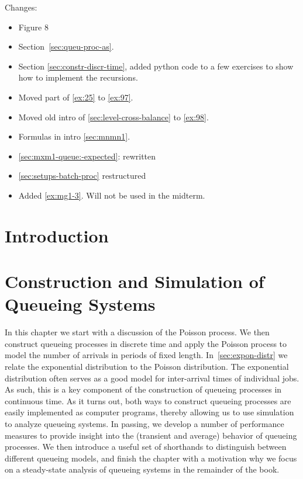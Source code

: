 \author{Nicky D. van  Foreest}


\frontmatter
\maketitle

Changes:
\begin{itemize}
\item Figure 8
\item Section~\ref{sec:queu-proc-as}.
\item Section \ref{sec:constr-discr-time}, added python code to a few exercises to show how to implement the recursions.
\item Moved part of \cref{ex:25} to \cref{ex:97}.
\item Moved old intro of \cref{sec:level-cross-balance} to \cref{ex:98}.
\item Formulas in intro \cref{sec:mnmn1}.
\item \cref{sec:mxm1-queue:-expected}: rewritten
\item \cref{sec:setups-batch-proc} restructured
\item Added \cref{ex:mg1-3}. Will not be used in the midterm.
\end{itemize}


\tableofcontents

\chapter{Introduction}
\label{cha:introduction}



\mainmatter

\chapter{Construction and Simulation of Queueing Systems}
\label{cha:single-stat-queu}

In this chapter we start with a discussion of the Poisson process.
We then construct queueing processes in discrete time and apply the Poisson process to model the number of arrivals in periods of fixed length.
In~\cref{sec:expon-distr} we relate the exponential distribution to the Poisson distribution.
The exponential distribution often serves as a good model for inter-arrival times of individual jobs.
As such, this is a key component of the construction of queueing processes in continuous time.
As it turns out, both ways to construct queueing processes are easily implemented as computer programs, thereby allowing us to use simulation to analyze queueing systems.
In passing, we develop a number of performance measures to provide insight into the (transient and average) behavior of queueing processes.
We then introduce a useful set of shorthands to distinguish between different queueing models, and finish the chapter with a motivation why we focus on a steady-state analysis of queueing systems in the remainder of the book.


